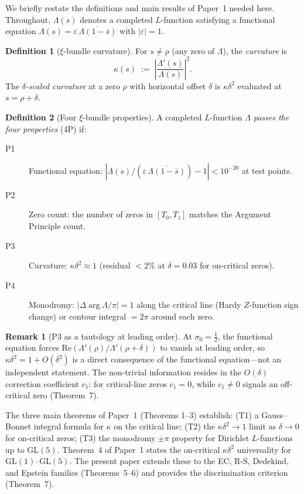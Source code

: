 \documentclass[11pt, a4paper]{article}
\theoremstyle{plain}
\theoremstyle{definition}
\newtheorem{definition}{Definition}[section]
\newtheorem{remark}{Remark}[section]
\begin{document}
We briefly restate the definitions and main results of Paper~1 needed
here.  Throughout, $\Lambda(s)$ denotes a completed $L$-function
satisfying a functional equation $\Lambda(s) = \varepsilon\,
\overline{\Lambda(1-\bar{s})}$ with $|\varepsilon|=1$.

\begin{definition}[$\xi$-bundle curvature]
  For $s\neq\rho$ (any zero of $\Lambda$), the \emph{curvature} is
  \[
    \kappa(s) \;:=\; \left|\frac{\Lambda'(s)}{\Lambda(s)}\right|^{2}.
  \]
  The \emph{$\delta$-scaled curvature} at a zero $\rho$ with horizontal
  offset $\delta$ is $\kappa\delta^{2}$ evaluated at $s = \rho+\delta$.
\end{definition}

\begin{definition}[Four $\xi$-bundle properties]
  A completed $L$-function $\Lambda$ \emph{passes the four properties}
  (4P) if:
  \begin{description}
    \item[P1] Functional equation: $|\Lambda(s)/(\varepsilon\,
      \overline{\Lambda(1-\bar{s})})-1|<10^{-20}$ at test points.
    \item[P2] Zero count: the number of zeros in $[T_{0}, T_{1}]$
      matches the Argument Principle count.
    \item[P3] Curvature: $\kappa\delta^{2}\approx 1$ (residual $<2\%$
      at $\delta=0.03$ for on-critical zeros).
    \item[P4] Monodromy: $|{}\Delta\!\arg\Lambda\!/\pi|=1$ along the
      critical line (Hardy $Z$-function sign change) or contour
      integral $=2\pi$ around each zero.
  \end{description}
\end{definition}

\begin{remark}[P3 as a tautology at leading order]
\label{rem:tautology}
  At $\sigma_{0}=\tfrac{1}{2}$, the functional equation forces
  $\mathrm{Re}(\Lambda'(\rho)/\Lambda'(\rho+\delta))$ to vanish at
  leading order, so $\kappa\delta^{2}=1+O(\delta^{2})$ is a direct
  consequence of the functional equation---not an independent
  statement.  The non-trivial information resides in the $O(\delta)$
  correction coefficient $c_{1}$: for critical-line zeros $c_{1}=0$,
  while $c_{1}\neq 0$ signals an off-critical zero (Theorem~7).
\end{remark}

The three main theorems of Paper~1 (Theorems 1--3) establish:
(T1) a Gauss--Bonnet integral formula for $\kappa$ on the critical line;
(T2) the $\kappa\delta^{2}\to 1$ limit as $\delta\to 0$ for on-critical
zeros; (T3) the monodromy $\pm\pi$ property for Dirichlet $L$-functions
up to $\mathrm{GL}(5)$.  Theorem~4 of Paper~1 states the on-critical
$\kappa\delta^{2}$ universality for $\mathrm{GL}(1)$--$\mathrm{GL}(5)$.
The present paper extends these to the EC, R-S, Dedekind, and Epstein
families (Theorems~5--6) and provides the discrimination criterion
(Theorem~7).
\end{document}
